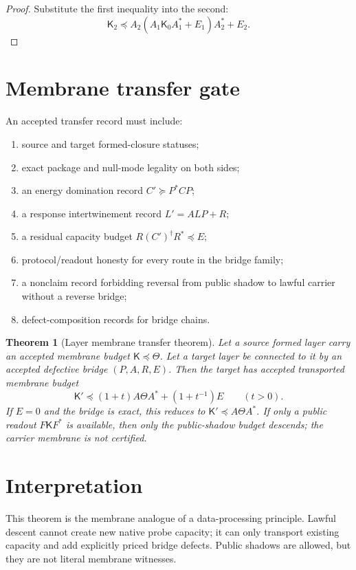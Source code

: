 \documentclass[11pt]{article}
\newtheorem{theorem}{Theorem}[section]
\newcommand{\K}{\mathsf K}
\newcommand{\pre}{\preceq}
\newcommand{\suc}{\succeq}
\begin{document}
\begin{proof}
Substitute the first inequality into the second:
\[
\K_2\pre A_2(A_1\K_0A_1^*+E_1)A_2^*+E_2.
\]
\end{proof}

\section{Membrane transfer gate}
An accepted transfer record must include:
\begin{enumerate}[label=\textbf{T\arabic*.}]
\item source and target formed-closure statuses;
\item exact package and null-mode legality on both sides;
\item an energy domination record \(C'\suc P^*CP\);
\item a response intertwinement record \(L'=ALP+R\);
\item a residual capacity budget \(R(C')^\dagger R^*\pre E\);
\item protocol/readout honesty for every route in the bridge family;
\item a nonclaim record forbidding reversal from public shadow to lawful carrier without a reverse bridge;
\item defect-composition records for bridge chains.
\end{enumerate}

\begin{theorem}[Layer membrane transfer theorem]
Let a source formed layer carry an accepted membrane budget \(\K\pre\Theta\). Let a target layer be connected to it by an accepted defective bridge \((P,A,R,E)\). Then the target has accepted transported membrane budget
\[
\boxed{\K'\pre (1+t)A\Theta A^*+(1+t^{-1})E\qquad(t>0).}
\]
If \(E=0\) and the bridge is exact, this reduces to \(\K'\pre A\Theta A^*\). If only a public readout \(F\K F^*\) is available, then only the public-shadow budget descends; the carrier membrane is not certified.
\end{theorem}

\section{Interpretation}
This theorem is the membrane analogue of a data-processing principle. Lawful descent cannot create new native probe capacity; it can only transport existing capacity and add explicitly priced bridge defects. Public shadows are allowed, but they are not literal membrane witnesses.
\end{document}
